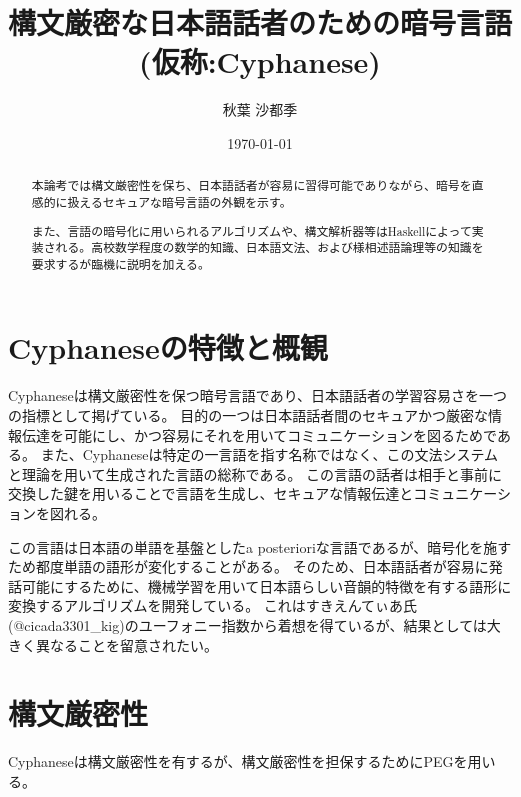 \documentclass{jsarticle}
\title{構文厳密な日本語話者のための暗号言語(仮称:Cyphanese)}
\author{秋葉 沙都季}
\date{\today}
\begin{document}
    \maketitle
    \begin{abstract}
        本論考では構文厳密性を保ち、日本語話者が容易に習得可能でありながら、暗号を直感的に扱えるセキュアな暗号言語の外観を示す。
        
        また、言語の暗号化に用いられるアルゴリズムや、構文解析器等はHaskellによって実装される。高校数学程度の数学的知識、日本語文法、および様相述語論理等の知識を要求するが臨機に説明を加える。
    \end{abstract}
    
    \section{Cyphaneseの特徴と概観}
    Cyphaneseは構文厳密性を保つ暗号言語であり、日本語話者の学習容易さを一つの指標として掲げている。
    目的の一つは日本語話者間のセキュアかつ厳密な情報伝達を可能にし、かつ容易にそれを用いてコミュニケーションを図るためである。
    また、Cyphaneseは特定の一言語を指す名称ではなく、この文法システムと理論を用いて生成された言語の総称である。
    この言語の話者は相手と事前に交換した鍵を用いることで言語を生成し、セキュアな情報伝達とコミュニケーションを図れる。
    
    この言語は日本語の単語を基盤としたa posterioriな言語であるが、暗号化を施すため都度単語の語形が変化することがある。
    そのため、日本語話者が容易に発話可能にするために、機械学習を用いて日本語らしい音韻的特徴を有する語形に変換するアルゴリズムを開発している。
    これはすきえんてぃあ氏(@cicada3301\_kig)のユーフォニー指数から着想を得ているが、結果としては大きく異なることを留意されたい。

    \section{構文厳密性}
    Cyphaneseは構文厳密性を有するが、構文厳密性を担保するためにPEGを用いる。
\end{document}
